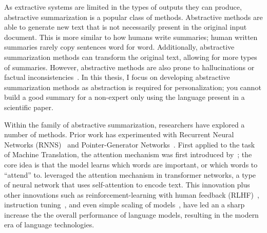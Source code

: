 As extractive systems are limited in the types of outputs they can produce, abstractive summarization is a popular class of methods. Abstractive methods are able to generate new text that is not necessarily present in the original input document. This is more similar to how humans write summaries; human written summaries rarely copy sentences word for word. Additionally, abstractive summarization methods can transform the original text, allowing for more types of summaries. However, abstractive methods are also prone to hallucinations or factual inconsistencies~\cite{Ji2022SurveyOH}. In this thesis, I focus on developing abstractive summarization methods as abstraction is required for personalization; you cannot build a good summary for a non-expert only using the language present in a scientific paper.

Within the family of abstractive summarization, researchers have explored a number of methods. Prior work has experimented with Recurrent Neural Networks (RNNS)~\cite{Rafi2021RNNEA} and Pointer-Generator Networks~\cite{see-etal-2017-get}. First applied to the task of Machine Translation, the attention mechanism was first introduced by~\textcite{Bahdanau2014NeuralMT}; the core idea is that the model learns which words are important, or which words to ``attend'' to. \textcite{Vaswani2017AttentionIA} leveraged the attention mechanism in transformer networks, a type of neural network that uses self-attention to encode text. This innovation plus other innovations such as reinforcement-learning with human feedback (RLHF)~\cite{NIPS2017_d5e2c0ad, NEURIPS2022_b1efde53}, instruction tuning~\cite{wei2022finetuned,chung2022scaling}, and even simple scaling of models~\cite{kaplan2020scaling, hoffmann2022training, Wei2022EmergentAO}, have led an a sharp increase the the overall performance of language models, resulting in the modern era of language technologies. 

